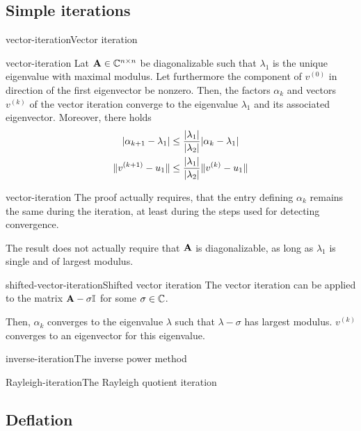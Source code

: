 
\subsection{Simple iterations}

\begin{Algorithm*}{vector-iteration}{Vector iteration}
  
\end{Algorithm*}

\begin{Theorem}{vector-iteration}
  Lat $\mathbf A\in\mathbb C^{n\times n}$ be diagonalizable such that $\lambda_1$ is the
  unique eigenvalue with maximal modulus. Let furthermore the
  component of $v^{(0)}$ in direction of the first eigenvector be
  nonzero. Then, the factors $\alpha_k$ and vectors $v^{(k)}$ of the
  vector iteration converge to the eigenvalue $\lambda_1$ and its
  associated eigenvector. Moreover, there holds
  \begin{align}
    \lvert\alpha_{k+1}-\lambda_1\rvert
    &\le \frac{\lvert\lambda_1\rvert}{\lvert\lambda_2\rvert} \lvert\alpha_{k}-\lambda_1\rvert\\
    \lVert v^{(k+1)}-u_1\rVert
    &\le \frac{\lvert\lambda_1\rvert}{\lvert\lambda_2\rvert} \lVert v^{(k)}-u_1\rVert
  \end{align}
\end{Theorem}

\begin{Remark}{vector-iteration}
  The proof actually requires, that the entry defining $\alpha_k$
  remains the same during the iteration, at least during the steps
  used for detecting convergence.

  The result does not actually require that $\mathbf A$ is diagonalizable,
  as long as $\lambda_1$ is single and of largest modulus.
\end{Remark}

\begin{Algorithm*}{shifted-vector-iteration}{Shifted vector iteration}
  The vector iteration can be applied to the matrix $\mathbf A-\sigma\mathbb I$
  for some $\sigma\in\mathbb C$.

  Then, $\alpha_k$ converges to the eigenvalue $\lambda$ such that
  $\lambda-\sigma$ has largest modulus. $v^{(k)}$ converges to an
  eigenvector for this eigenvalue.
\end{Algorithm*}

\begin{Algorithm*}{inverse-iteration}{The inverse power method}
  
\end{Algorithm*}

\begin{Algorithm*}{Rayleigh-iteration}{The Rayleigh quotient iteration}
  
\end{Algorithm*}

\subsection{Deflation}

